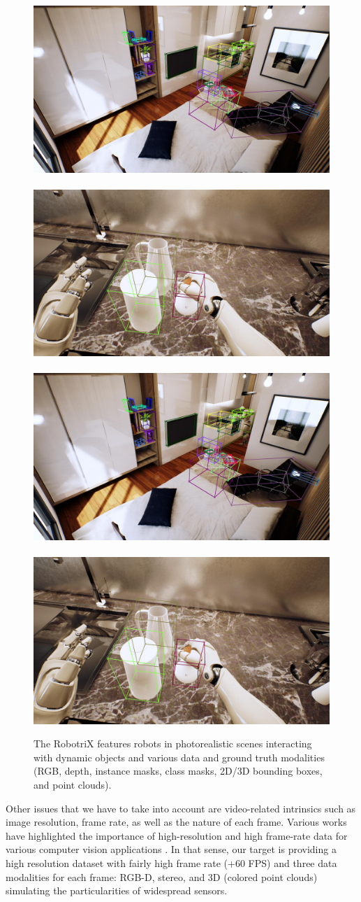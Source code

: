 \begin{figure}[!htb]
    \includegraphics[width=0.48\linewidth]{Figures/Sim2Real/header_bbox}~
    \includegraphics[width=0.48\linewidth]{Figures/Sim2Real/header_bbox_2}\\\ \\
    \includegraphics[width=0.48\linewidth]{Figures/Sim2Real/header_bbox}~
    \includegraphics[width=0.48\linewidth]{Figures/Sim2Real/header_bbox_2}
    \caption{The RobotriX features robots in photorealistic scenes interacting with dynamic objects and various data and ground truth modalities (RGB, depth, instance masks, class masks, 2D/3D bounding boxes, and point clouds).}
    \label{fig:sim2real:robotrix}
\end{figure}

\clearpage

Other issues that we have to take into account are video-related intrinsics such as image resolution, frame rate, as well as the nature of each frame. Various works have highlighted the importance of high-resolution and high frame-rate data for various computer vision applications \cite{Handa2012}\cite{Held2016}. In that sense, our target is providing a high resolution dataset with fairly high frame rate (+60 FPS) and three data modalities for each frame: RGB-D, stereo, and 3D (colored point clouds) simulating the particularities of widespread sensors.


